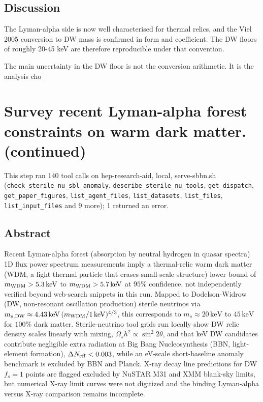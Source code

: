 \documentclass[11pt,a4paper]{article}
\begin{document}
\subsection{Discussion}
The Lyman-alpha side is now well characterised for thermal relics, and the Viel 2005 conversion to DW mass is confirmed in form and coefficient. The DW floors of roughly 20-45 keV are therefore reproducible under that convention.

The main uncertainty in the DW floor is not the conversion arithmetic. It is the analysis cho


\section{Survey recent Lyman-alpha forest constraints on warm dark matter. (continued)}
This step ran 140 tool calls on hep-research-aid, local, serve-sbbn.sh (\texttt{check\_sterile\_nu\_sbl\_anomaly}, \texttt{describe\_sterile\_nu\_tools}, \texttt{get\_dispatch}, \texttt{get\_paper\_figures}, \texttt{list\_agent\_files}, \texttt{list\_datasets}, \texttt{list\_files}, \texttt{list\_input\_files} and 9 more); 1 returned an error.\par
\subsection{Abstract}
Recent Lyman-alpha forest (absorption by neutral hydrogen in quasar spectra) 1D flux power spectrum measurements imply a thermal-relic warm dark matter (WDM, a light thermal particle that erases small-scale structure) lower bound of $m_{\rm WDM} > 5.3\,\mathrm{keV}$ to $m_{\rm WDM} > 5.7\,\mathrm{keV}$ at $95\%$ confidence, not independently verified beyond web-search snippets in this run. Mapped to Dodelson-Widrow (DW, non-resonant oscillation production) sterile neutrinos via $m_{s,{\rm DW}} \approx 4.43\,\mathrm{keV}\,(m_{\rm WDM}/1\,\mathrm{keV})^{4/3}$, this corresponds to $m_s \approx 20\,\mathrm{keV}$ to $45\,\mathrm{keV}$ for $100\%$ dark matter. Sterile-neutrino tool grids run locally show DW relic density scales linearly with mixing, $\Omega_s h^2 \propto \sin^2 2\theta$, and that keV DW candidates contribute negligible extra radiation at Big Bang Nucleosynthesis (BBN, light-element formation), $\Delta N_{\rm eff} < 0.003$, while an eV-scale short-baseline anomaly benchmark is excluded by BBN and Planck. X-ray decay line predictions for DW $f_s=1$ points are flagged excluded by NuSTAR M31 and XMM blank-sky limits, but numerical X-ray limit curves were not digitized and the binding Lyman-alpha versus X-ray comparison remains incomplete.
\end{document}

